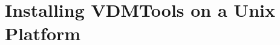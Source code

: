 \documentclass[\pformat,12pt]{article}
\newcommand{\Toolbox}{VDMTools}
\newcommand{\vdmde}{vdmde}
\newcommand{\vdmgde}{vdmgde}
\newcommand{\vdmhome}{vdmhome}
\newcommand{\Toolbox}{VDMTools}
\newcommand{\vdmde}{vppde}
\newcommand{\vdmgde}{vppgde}
\newcommand{\vdmhome}{vpphome}
\newcommand{\Index}[1]{#1\index{#1}}
\begin{document}



\newpage
\section{Installing VDMTools on a Unix Platform}



%
%
%  
%  
%  
%
%
%
  
\end{document}
